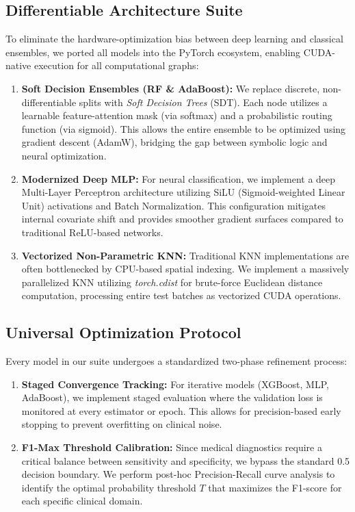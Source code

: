 \documentclass[conference]{IEEEtran}
\begin{document}
\subsection{Differentiable Architecture Suite}
To eliminate the hardware-optimization bias between deep learning and classical ensembles, we ported all models into the PyTorch ecosystem, enabling CUDA-native execution for all computational graphs:
\begin{enumerate}[nosep, leftmargin=*]
    \item \textbf{Soft Decision Ensembles (RF \& AdaBoost):} We replace discrete, non-differentiable splits with \textit{Soft Decision Trees} (SDT). Each node utilizes a learnable feature-attention mask (via softmax) and a probabilistic routing function (via sigmoid). This allows the entire ensemble to be optimized using gradient descent (AdamW), bridging the gap between symbolic logic and neural optimization.
    \item \textbf{Modernized Deep MLP:} For neural classification, we implement a deep Multi-Layer Perceptron architecture utilizing SiLU (Sigmoid-weighted Linear Unit) activations and Batch Normalization. This configuration mitigates internal covariate shift and provides smoother gradient surfaces compared to traditional ReLU-based networks.
    \item \textbf{Vectorized Non-Parametric KNN:} Traditional KNN implementations are often bottlenecked by CPU-based spatial indexing. We implement a massively parallelized KNN utilizing \textit{torch.cdist} for brute-force Euclidean distance computation, processing entire test batches as vectorized CUDA operations.
\end{enumerate}
\vspace{-1ex}
\subsection{Universal Optimization Protocol}
Every model in our suite undergoes a standardized two-phase refinement process:
\begin{enumerate}[nosep, leftmargin=*]
    \item \textbf{Staged Convergence Tracking:} For iterative models (XGBoost, MLP, AdaBoost), we implement staged evaluation where the validation loss is monitored at every estimator or epoch. This allows for precision-based early stopping to prevent overfitting on clinical noise.
    \item \textbf{F1-Max Threshold Calibration:} Since medical diagnostics require a critical balance between sensitivity and specificity, we bypass the standard 0.5 decision boundary. We perform post-hoc Precision-Recall curve analysis to identify the optimal probability threshold $T$ that maximizes the F1-score for each specific clinical domain.
\end{enumerate}
\vspace{-1ex}
\end{document}
